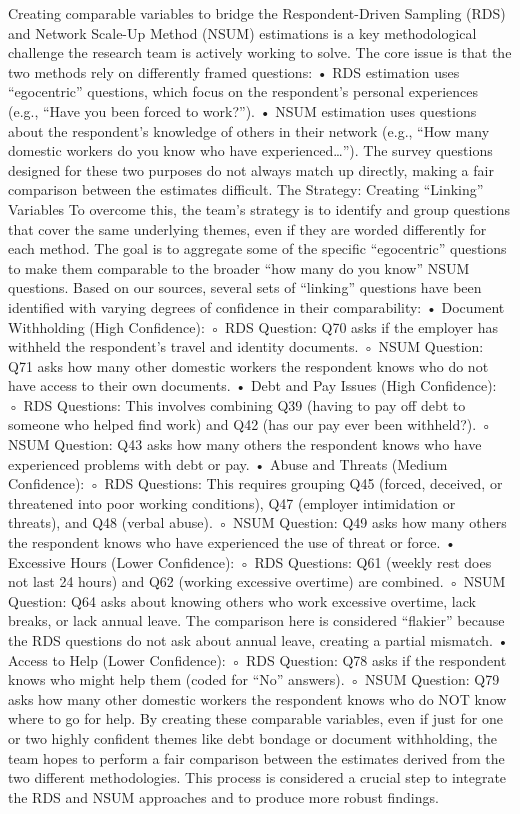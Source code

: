 \documentclass[
  12pt,
  letterpaper,
  DIV=11,
  numbers=noendperiod]{scrartcl}
\theoremstyle{plain}
\theoremstyle{definition}
\begin{document}
Creating comparable variables to bridge the Respondent-Driven Sampling
(RDS) and Network Scale-Up Method (NSUM) estimations is a key
methodological challenge the research team is actively working to solve.
The core issue is that the two methods rely on differently framed
questions: • RDS estimation uses ``egocentric'' questions, which focus
on the respondent's personal experiences (e.g., ``Have you been forced
to work?''). • NSUM estimation uses questions about the respondent's
knowledge of others in their network (e.g., ``How many domestic workers
do you know who have experienced\ldots{}''). The survey questions
designed for these two purposes do not always match up directly, making
a fair comparison between the estimates difficult. The Strategy:
Creating ``Linking'' Variables To overcome this, the team's strategy is
to identify and group questions that cover the same underlying themes,
even if they are worded differently for each method. The goal is to
aggregate some of the specific ``egocentric'' questions to make them
comparable to the broader ``how many do you know'' NSUM questions. Based
on our sources, several sets of ``linking'' questions have been
identified with varying degrees of confidence in their comparability: •
Document Withholding (High Confidence): ◦ RDS Question: Q70 asks if the
employer has withheld the respondent's travel and identity documents. ◦
NSUM Question: Q71 asks how many other domestic workers the respondent
knows who do not have access to their own documents. • Debt and Pay
Issues (High Confidence): ◦ RDS Questions: This involves combining Q39
(having to pay off debt to someone who helped find work) and Q42 (has
our pay ever been withheld?). ◦ NSUM Question: Q43 asks how many others
the respondent knows who have experienced problems with debt or pay. •
Abuse and Threats (Medium Confidence): ◦ RDS Questions: This requires
grouping Q45 (forced, deceived, or threatened into poor working
conditions), Q47 (employer intimidation or threats), and Q48 (verbal
abuse). ◦ NSUM Question: Q49 asks how many others the respondent knows
who have experienced the use of threat or force. • Excessive Hours
(Lower Confidence): ◦ RDS Questions: Q61 (weekly rest does not last 24
hours) and Q62 (working excessive overtime) are combined. ◦ NSUM
Question: Q64 asks about knowing others who work excessive overtime,
lack breaks, or lack annual leave. The comparison here is considered
``flakier'' because the RDS questions do not ask about annual leave,
creating a partial mismatch. • Access to Help (Lower Confidence): ◦ RDS
Question: Q78 asks if the respondent knows who might help them (coded
for ``No'' answers). ◦ NSUM Question: Q79 asks how many other domestic
workers the respondent knows who do NOT know where to go for help. By
creating these comparable variables, even if just for one or two highly
confident themes like debt bondage or document withholding, the team
hopes to perform a fair comparison between the estimates derived from
the two different methodologies. This process is considered a crucial
step to integrate the RDS and NSUM approaches and to produce more robust
findings.
\end{document}
